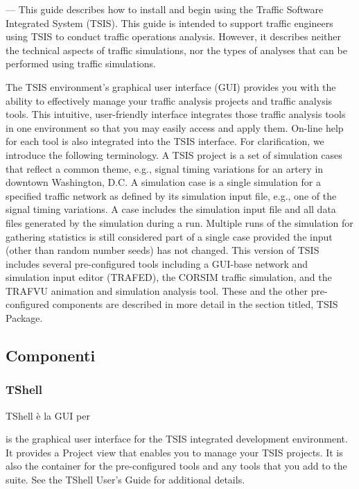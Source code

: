 ---
This guide describes how to install and begin using the Traffic Software Integrated System (TSIS). This guide is
intended to support traffic engineers using TSIS to conduct traffic operations analysis. However, it describes neither
the technical aspects of traffic simulations, nor the types of analyses that can be performed using traffic simulations.

The TSIS environment's graphical user interface (GUI) provides you with the ability to effectively manage your
traffic analysis projects and traffic analysis tools. This intuitive, user-friendly interface integrates those traffic
analysis tools in one environment so that you may easily access and apply them. On-line help for each tool is also
integrated into the TSIS interface.
For clarification, we introduce the following terminology. A TSIS project is a set of simulation cases that reflect a
common theme, e.g., signal timing variations for an artery in downtown Washington, D.C. A simulation case is a
single simulation for a specified traffic network as defined by its simulation input file, e.g., one of the signal timing
variations. A case includes the simulation input file and all data files generated by the simulation during a run.
Multiple runs of the simulation for gathering statistics is still considered part of a single case provided the input
(other than random number seeds) has not changed.
This version of TSIS includes several pre-configured tools including a GUI-base network and simulation input
editor (TRAFED), the CORSIM traffic simulation, and the TRAFVU animation and simulation analysis tool. These
and the other pre-configured components are described in more detail in the section titled, TSIS Package.

\subsection{Componenti}

\subsubsection{TShell}

TShell è la \acs{GUI} per 

is the graphical user interface for the TSIS integrated development environment. It provides a Project view
that enables you to manage your TSIS projects. It is also the container for the pre-configured tools and any tools
that you add to the suite. See the TShell User's Guide for additional details.


